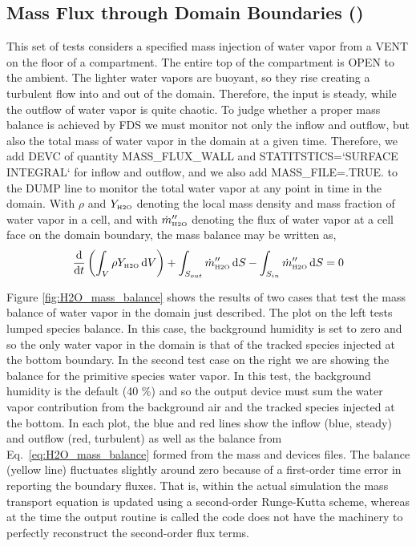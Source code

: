 \documentclass[11pt]{book}
\begin{document}
\subsection{Mass Flux through Domain Boundaries (\texorpdfstring{}{mass\_flux\_wall})}
\label{mass_flux_wall}

This set of tests considers a specified mass injection of water vapor from a {\ct VENT} on the floor of a compartment.  The entire top of the compartment is {\ct OPEN} to the ambient.  The lighter water vapors are buoyant, so they rise creating a turbulent flow into and out of the domain.  Therefore, the input is steady, while the outflow of water vapor is quite chaotic.  To judge whether a proper mass balance is achieved by FDS we must monitor not only the inflow and outflow, but also the total mass of water vapor in the domain at a given time.  Therefore, we add {\ct DEVC} of quantity {\ct MASS\_FLUX\_WALL} and {\ct STATITSTICS=`SURFACE INTEGRAL`} for inflow and outflow, and we also add {\ct MASS\_FILE=.TRUE.} to the {\ct DUMP} line to monitor the total water vapor at any point in time in the domain.  With $\rho$ and $Y_{\mbox{\tiny H2O}}$ denoting the local mass density and mass fraction of water vapor in a cell, and with $\dot{m}_{\mbox{\tiny H2O}}^{\prime\prime}$ denoting the flux of water vapor at a cell face on the domain boundary, the mass balance may be written as,
\begin{equation}
\label{eq:H2O_mass_balance}
\frac{\mbox{d}}{\mbox{d}t} \left( \int_{V} \rho Y_{\mbox{\tiny H2O}} \,\mbox{d}V \right) + \int_{S_{out}} \dot{m}_{\mbox{\tiny H2O}}^{\prime\prime} \,\mbox{d}S - \int_{S_{in}} \dot{m}_{\mbox{\tiny H2O}}^{\prime\prime} \,\mbox{d}S = 0
\end{equation}

Figure \ref{fig:H2O_mass_balance} shows the results of two cases that test the mass balance of water vapor in the domain just described.  The plot on the left tests lumped species balance.  In this case, the background humidity is set to zero and so the only water vapor in the domain is that of the tracked species injected at the bottom boundary.  In the second test case on the right we are showing the balance for the primitive species water vapor.  In this test, the background humidity is the default (40 \%) and so the output device must sum the water vapor contribution from the background air and the tracked species injected at the bottom.  In each plot, the blue and red lines show the inflow (blue, steady) and outflow (red, turbulent) as well as the balance from Eq.~\ref{eq:H2O_mass_balance} formed from the mass and devices files.  The balance (yellow line) fluctuates slightly around zero because of a first-order time error in reporting the boundary fluxes.  That is, within the actual simulation the mass transport equation is updated using a second-order Runge-Kutta scheme, whereas at the time the output routine is called the code does not have the machinery to perfectly reconstruct the second-order flux terms.
\end{document}
